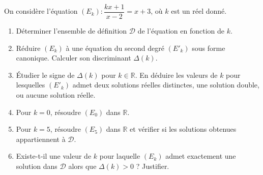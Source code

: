 \documentclass[11pt]{article}
\begin{document}
\begin{exercice}
On considère l'équation $(E_k) : \dfrac{kx+1}{x-2} = x+3$, où $k$ est un réel donné.
\begin{enumerate}
    \item Déterminer l'ensemble de définition $\mathcal{D}$ de l'équation en fonction de $k$.
    \item Réduire $(E_k)$ à une équation du second degré $(E'_k)$ sous forme canonique. Calculer son discriminant $\Delta(k)$.
    \item Étudier le signe de $\Delta(k)$ pour $k \in \mathbb{R}$. En déduire les valeurs de $k$ pour lesquelles $(E'_k)$ admet deux solutions réelles distinctes, une solution double, ou aucune solution réelle.
    \item Pour $k=0$, résoudre $(E_0)$ dans $\mathbb{R}$.
    \item Pour $k=5$, résoudre $(E_5)$ dans $\mathbb{R}$ et vérifier si les solutions obtenues appartiennent à $\mathcal{D}$.
    \item Existe-t-il une valeur de $k$ pour laquelle $(E_k)$ admet exactement une solution dans $\mathcal{D}$ alors que $\Delta(k) > 0$ ? Justifier.
\end{enumerate}
\end{exercice}
\end{document}
